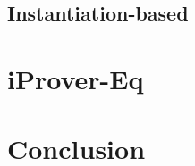 \documentclass[]{clmthesis}
\begin{document}
\subsection{Instantiation-based}
\section{iProver-Eq}
\section{Conclusion}






\appendix

%

\end{document}
